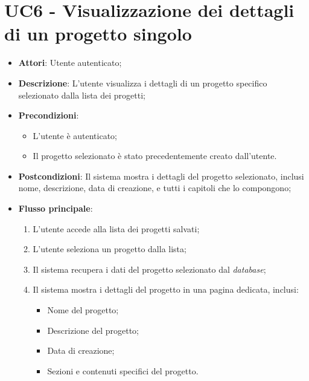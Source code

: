 \vspace{0.5cm}  
\section*{UC6 - Visualizzazione dei dettagli di un progetto singolo}
\begin{itemize}
    \item \textbf{Attori}: Utente autenticato;
    \item \textbf{Descrizione}: L'utente visualizza i dettagli di un progetto specifico selezionato dalla lista dei progetti;
    \item \textbf{Precondizioni}: 
    \begin{itemize}
        \item L'utente è autenticato;
        \item Il progetto selezionato è stato precedentemente creato dall'utente.
    \end{itemize}
    \item \textbf{Postcondizioni}: Il sistema mostra i dettagli del progetto selezionato, inclusi nome, descrizione, data di creazione, e tutti i capitoli che lo compongono;
    \item \textbf{Flusso principale}:
    \begin{enumerate}
        \item L'utente accede alla lista dei progetti salvati;
        \item L'utente seleziona un progetto dalla lista;
        \item Il sistema recupera i dati del progetto selezionato dal \textit{database};
        \item Il sistema mostra i dettagli del progetto in una pagina dedicata, inclusi:
        \begin{itemize}
            \item Nome del progetto;
            \item Descrizione del progetto;
            \item Data di creazione;
            \item Sezioni e contenuti specifici del progetto.
        \end{itemize}
    \end{enumerate}
\end{itemize}

\vspace{0.5cm}  

